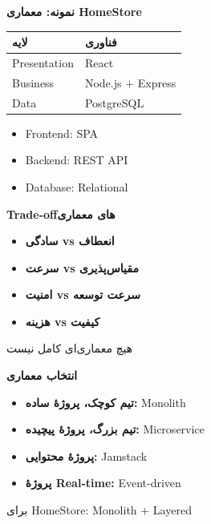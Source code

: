 \documentclass[14pt, a4paper, landscape]{extarticle}
\newcommand{\slide}[1]{%
    \newpage
    \begin{center}
    \begin{minipage}[t]{0.95\textwidth}
    \vspace{0.5cm}
    #1
    \vspace{0.5cm}
    \end{minipage}
    \end{center}
}
\newcommand{\slidetitle}[1]{%
    \begin{center}
        {\LARGE\bfseries\textcolor{primary}{#1}}
    \end{center}
    \vspace{0.5cm}
}
\newcommand{\myaccent}[1]{\textcolor{accent}{#1}}
\begin{document}
\slide{
    \slidetitle{نمونه: معماری HomeStore}
    \vspace{0.5cm}
    \begin{center}
        \begin{tabular}{ll}
            \toprule
            \textbf{لایه} & \textbf{فناوری} \\
            \midrule
            Presentation & React \\
            \hline
            Business & Node.js + Express \\
            \hline
            Data & PostgreSQL \\
            \bottomrule
        \end{tabular}
    \end{center}
    \vspace{0.5cm}
    \begin{itemize}[itemsep=0.3em]
        \item Frontend: SPA
        \item Backend: REST API
        \item Database: Relational
    \end{itemize}
}

\slide{
    \slidetitle{Trade-offهای معماری}
    \vspace{0.5cm}
    \begin{itemize}[itemsep=0.6em]
        \item \textbf{سادگی vs انعطاف}
        \item \textbf{سرعت vs مقیاس‌پذیری}
        \item \textbf{امنیت vs سرعت توسعه}
        \item \textbf{هزینه vs کیفیت}
    \end{itemize}
    \vspace{1cm}
    \begin{center}
        {\large\myaccent{هیچ معماری‌ای کامل نیست}}
    \end{center}
}

\slide{
    \slidetitle{انتخاب معماری}
    \vspace{0.5cm}
    \begin{itemize}[itemsep=0.6em]
        \item \textbf{تیم کوچک، پروژهٔ ساده:} Monolith
        \item \textbf{تیم بزرگ، پروژهٔ پیچیده:} Microservice
        \item \textbf{پروژهٔ محتوایی:} Jamstack
        \item \textbf{پروژهٔ Real-time:} Event-driven
    \end{itemize}
    \vspace{1cm}
    \begin{center}
        {\myaccent{برای HomeStore: Monolith + Layered}}
    \end{center}
}
\end{document}
